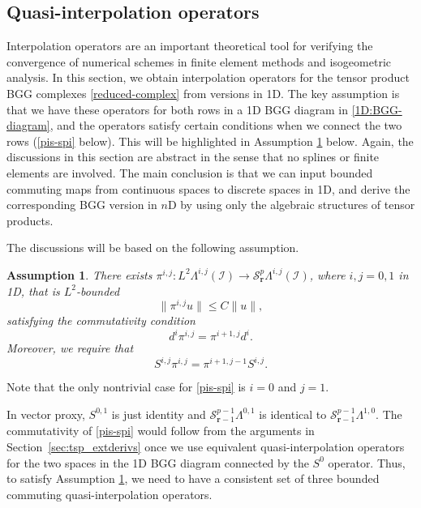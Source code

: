 \documentclass[final]{amsart}%
\newtheorem{assumption}{Assumption}
\newcommand{\0}{\mathaccent23}
\newcommand{\br}{\mathbf r}
\begin{document}
\subsection{Quasi-interpolation operators}\label{sec:quasi_interp}

Interpolation operators are an important theoretical tool for verifying the convergence of numerical schemes in finite element methods and isogeometric analysis. In this section, we obtain interpolation operators for the tensor product BGG complexes \eqref{reduced-complex} from versions in 1D. The key assumption is that we have these operators for both rows in a 1D BGG diagram in \eqref{1D:BGG-diagram}, and the operators satisfy certain conditions when we connect the two rows (\eqref{pis-spi} below). This will be highlighted in Assumption \ref{assump:interp} below. Again, the discussions in this section are abstract in the sense that no splines or finite elements are involved. 
The main conclusion is that we can input bounded commuting maps from continuous spaces to discrete spaces in 1D, and derive the corresponding BGG version in $n$D by using only the algebraic structures of tensor products.  

The discussions will be based on the following assumption.
\begin{assumption}\label{assump:interp}
There exists $\pi^{i, j}: L^{2}\Lambda^{i, j}(\mathcal{I})\to \mathscr{S}^{p}_{\br}\Lambda^{i, j}(\mathcal{I})$, where $i, j=0, 1$ in 1D, that is $L^2$-bounded
$$
\|\pi^{i, j}u\|\leq C\|u\|,
$$
satisfying the commutativity condition
\begin{equation}\label{1D:commutdpi}
  d^{i}\pi^{i, j}=\pi^{i+1, j}d^{i}.  
\end{equation}
 Moreover, we require that 
\begin{equation}\label{pis-spi}
S^{i, j}\pi^{i, j}=\pi^{i+1, j-1}S^{i, j}.
\end{equation}
\end{assumption}
Note that the only nontrivial case for \eqref{pis-spi} is $i=0$ and $j=1$.

In vector proxy,  $S^{0, 1}$ is just identity and $\mathcal{S}^{p-1}_{\br-1}\Lambda^{0, 1}$ is identical to $\mathcal{S}^{p-1}_{\br-1}\Lambda^{1, 0}$. The commutativity of \eqref{pis-spi} would follow from the arguments in Section~\ref{sec:tsp_extderivs} once we use equivalent  quasi-interpolation operators for the two spaces in the 1D BGG diagram connected by the $S^0$ operator. Thus, to satisfy Assumption \ref{assump:interp}, we need to have a consistent set of three bounded commuting quasi-interpolation operators. 
\end{document}
